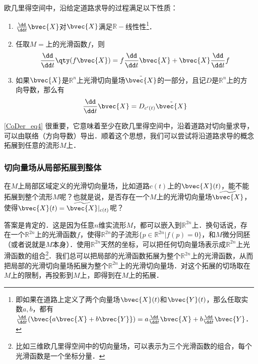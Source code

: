 欧几里得空间中，沿给定道路求导的过程满足以下性质：
\begin{enumerate}
\item $\frac{\dd }{\dd t}\bvec{X}$对$\bvec{X}$满足$\mathbb{R}-$线性性\footnote{即如果在道路上定义了两个向量场$\bvec{X}(t)$和$\bvec{Y}(t)$，那么任取实数$a, b$，都有$\frac{\dd}{\dd t}(\bvec{a\bvec{X}+b\bvec{Y}})=a\frac{\dd}{\dd t}\bvec{X}+b\frac{\dd}{\dd t}\bvec{Y}$．}．
\item 任取$M=$上的光滑函数$f$，则
\begin{equation}
\frac{\dd}{\dd t}\qty(f\bvec{X})=f\frac{\dd}{\dd t}\bvec{X}+\bvec{X}\frac{\dd}{\dd t}f
\end{equation}
\item 如果$\bvec{X}$是$\mathbb{R}^n$上光滑切向量场$\tilde{\bvec{X}}$的一部分，且记$D$是$\mathbb{R}^n$上的方向导数，那么有
\begin{equation}\label{CoDer_eq4}
\frac{\dd}{\dd t}\bvec{X}=D_{c'(t)}\tilde{\bvec{X}}
\end{equation}

\end{enumerate}

\autoref{CoDer_eq4} 很重要，它意味着至少在欧几里得空间中，沿着道路对切向量求导，可以由联络（方向导数）导出．顺着这个思想，我们可以尝试将沿道路求导的概念拓展到任意的流形$M$上． 

\subsubsection{切向量场从局部拓展到整体}

在$M$上局部区域定义的光滑切向量场，比如道路$c(t)$上的$\bvec{X}(t)$，能不能拓展到整个流形$M$呢？也就是说，是否存在一个$M$上的光滑切向量场$\widetilde{\bvec{X}}$，使得$\bvec{X}(t)=\widetilde{\bvec{X}}|_{c(t)}$呢？

答案是肯定的．这是因为任意$n$维实流形$M$，都可以嵌入到$\mathbb{R}^{2n}$上．换句话说，存在一个$\mathbb{R}^{2n}$上的光滑函数$f$，使得$\mathbb{R}^{2n}$的子流形$\{p\in\mathbb{R}^{2n}|f(p)=0\}$，和$M$微分同胚（或者说就是$M$本身）．使用$\mathbb{R}^{2n}$天然的坐标，可以把任何切向量场表示成$\mathbb{R}^{2n}$上光滑函数的组合\footnote{比如三维欧几里得空间中的切向量场，可以表示为三个光滑函数的组合，每个光滑函数是一个坐标分量．}．我们总可以把局部的光滑函数拓展为整个$\mathbb{R}^{2n}$上的光滑函数，从而把局部的光滑切向量场拓展为整个$\mathbb{R}^{2n}$上的光滑切向量场．对这个拓展的切场取在$M$上的限制，再投影到$M$上，即得到在$M$上的拓展．

